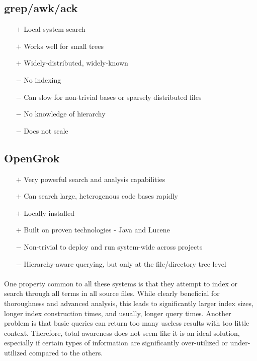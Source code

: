 \documentclass{article}
\begin{document}
\subsection{grep/awk/ack}
	\begin{itemize}
	\item[$+$] Local system search
    \item[$+$] Works well for small trees
    \item[$+$] Widely-distributed, widely-known   
   
    \item[$-$] No indexing
    \item[$-$] Can slow for non-trivial bases or sparsely distributed files
    \item[$-$] No knowledge of hierarchy
    \item[$-$] Does not scale
    \end{itemize}
    
\subsection{OpenGrok}
	\begin{itemize}
    \item[$+$] Very powerful search and analysis capabilities
    \item[$+$] Can search large, heterogenous code bases rapidly
    \item[$+$] Locally installed
    \item[$+$] Built on proven technologies - Java and Lucene
    
    \item[$-$] Non-trivial to deploy and run system-wide across projects
    \item[$-$] Hierarchy-aware querying, but only at the file/directory tree level
	\end{itemize}

\paragraph{}
One property common to all these systems is that they attempt to index or search through all terms in all source files. While clearly beneficial for thoroughness and advanced analysis, this leads to significantly larger index sizes, longer index construction times, and usually, longer query times. Another problem is that basic queries can return too many useless results with too little context. Therefore, total awareness does not seem like it is an ideal solution, especially if certain types of information are significantly over-utilized or under-utilized compared to the others.
\end{document}

